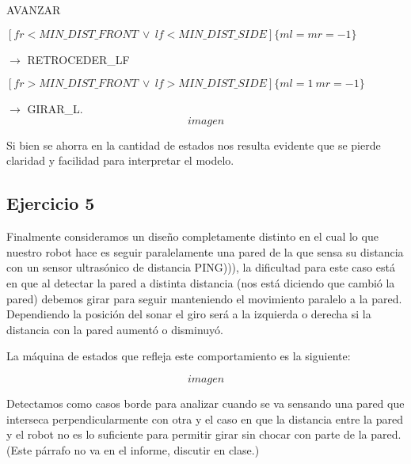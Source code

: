AVANZAR  

$[fr < MIN\_DIST\_FRONT \: \lor \: lf < MIN\_DIST\_SIDE] \{ml = mr = -1\} $

$\rightarrow$  RETROCEDER\_LF 

$ [fr > MIN\_DIST\_FRONT \: \lor \: lf > MIN\_DIST\_SIDE] \{ml = 1 \: mr = -1\}$

$\rightarrow$ GIRAR\_L.
$$imagen$$

Si bien se ahorra en la cantidad de estados nos resulta evidente que se pierde claridad y facilidad para interpretar el modelo.




\subsection{Ejercicio 5}
Finalmente consideramos un diseño completamente distinto en el cual lo que nuestro robot hace es seguir paralelamente una pared de la que sensa su distancia con un sensor ultrasónico de distancia PING))), la dificultad para este caso está en que al detectar la pared a distinta distancia (nos está diciendo que cambió la pared) debemos girar para seguir manteniendo el movimiento paralelo a la pared. Dependiendo la posición del sonar el giro será a la izquierda o derecha si la distancia con la pared aumentó o disminuyó.

La máquina de estados que refleja este comportamiento es la siguiente:

$$imagen$$

Detectamos como casos borde para analizar cuando se va sensando una pared que interseca perpendicularmente con otra y el caso en que la distancia entre la pared y el robot no es lo suficiente para permitir girar sin chocar con parte de la pared. (Este párrafo no va en el informe, discutir en clase.)